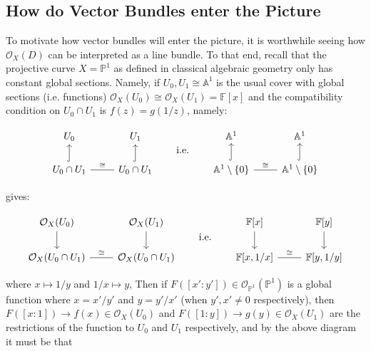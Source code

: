 \documentclass{book}
\newcommand{\A}{{\mathbb{A}}}
\newcommand{\F}{{\mathbb{F}}}
\renewcommand{\P}{{\mathbb{P}}}
\newcommand{\CO}{{\mathcal{O}}}
\begin{document}
\subsection{How do Vector Bundles enter the Picture}\label{sec:whyVecBundles}

To motivate how vector bundles will enter the picture, it is worthwhile seeing how $\CO_X(D)$ can be
interpreted as a line bundle. To that end, recall that the projective curve $X = \P^1$ as defined in classical
algebraic geometry only has constant global sections. Namely, if $U_0, U_1\cong \A^1$ is the usual cover with
global sections (i.e. functions) $\CO_X(U_0) \cong \CO_X(U_1) = \F[x]$ and the compatibility condition on
$U_0\cap U_1$ is $f(z) = g(1/z)$, namely:
\begin{center}
  \[
\begin{tikzcd}
U_0                                               &               U_1 \\
     U_0\cap U_1 \arrow[r, "\cong", no head] \arrow[u, hook] & U_0\cap U_1 \arrow[u, hook]
\end{tikzcd}
\qquad \text{i.e.} \qquad
\begin{tikzcd}
\A^1                                       &              \A^1 \\
     \A^1\setminus\{0\} \arrow[u, hook] \arrow[r, "\cong", no head] & \A^1\setminus\{0\} \arrow[u, hook]
\end{tikzcd}
\]
\end{center}
gives:
\begin{center}
  \[
\begin{tikzcd}
\CO_X(U_0) \arrow[d]                                &              \CO_X(U_1) \arrow[d] \\
                    \CO_X(U_0\cap U_1) \arrow[r, "\cong", no head] & \CO_X(U_0\cap U_1)
\end{tikzcd}
\qquad \text{i.e.} \qquad
\begin{tikzcd}
{\F[x]} \arrow[d]                        & {\F[y]} \arrow[d] \\
{\F[x, 1/x]} \arrow[r, "\cong", no head] & {\F[y, 1/y]}
\end{tikzcd}
\]
\end{center}
where $x \mapsto 1/y$ and $1/x \mapsto y$, Then if $F([x':y']) \in
\CO_{\P^1}(\P^1)$ is a global function where $x = x'/y'$ and $y =y'/x'$ (when $y',x'\ne 0$ respectively), then $F([x:1]) \to f(x) \in \CO_X(U_0)$ and $F([1:y]) \to g(y) \in \CO_X(U_1)$
are the restrictions of the function to $U_0$ and $U_1$ respectively, and by the above diagram it must be that
\end{document}
